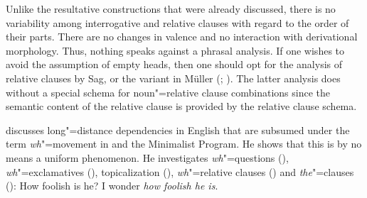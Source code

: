 \begin{exe}
\begin{xlist}[iv.]
\begin{exe}
\begin{xlist}[iv.]
Unlike the resultative constructions that were already discussed, there is no variability among interrogative and relative clauses with regard to the order of
their parts. There are no changes in valence and no interaction with derivational morphology. Thus, nothing speaks against a phrasal
analysis.
If one wishes to avoid the assumption of empty heads, then one should opt for the analysis of relative clauses 
by Sag, or the variant in Müller (\citeyear[Chapter~10]{Mueller99a}; \citeyear[Chapter~11]{MuellerLehrbuch1}). The latter analysis does without a special schema
for noun"=relative clause combinations since the semantic content of the relative clause is provided by the relative clause
schema.%

\citet{Sag2010b} discusses long"=distance dependencies in English that are subsumed
under the term \emph{wh}"=movement in \gbt and the Minimalist Program\indexmp. He shows that this is by no means a
uniform phenomenon.  He investigates \emph{wh}"=questions (),
\emph{wh}"=exclamatives (),
topicalization (), \emph{wh}"=relative clauses
() and \emph{the}"=clauses ():
\eal
\ex How foolish is he?
\ex I wonder \emph{how foolish he is}.
\zl


\end{xlist}
\end{exe}
\end{xlist}
\end{exe}
